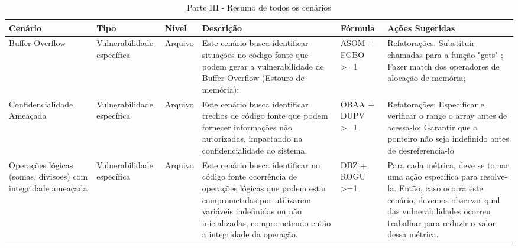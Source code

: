 \begin{landscape}
	\begin{table}[H]
		\begin{center}
	    \begin{tabular}{ |p{}| p{3cm} | p{2cm} | p{5cm} | p{3.5cm}  | p{6.5cm}  |}
	    \hline
Cenário                                                      & Tipo                       & Nível   & Descrição                                                                                                                                                                                                                                                                          & Fórmula                    & Ações Sugeridas                                                                                                                                                                                         \\ \hline
Buffer Overflow                                              & Vulnerabilidade específica & Arquivo & Este cenário busca identificar situações no código fonte que podem gerar a vulnerabilidade de Buffer Overflow (Estouro de memória);                                                                                                                                                & ASOM + FGBO \textgreater=1 & Refatorações: Substituir chamadas para a função "gets" ; Fazer match dos operadores de alocação de memória;                                                                                             \\ \hline
Confidencialidade Ameaçada                                   & Vulnerabilidade específica & Arquivo & Este cenário busca identificar trechos de código fonte que podem fornecer informações não autorizadas, impactando na confidencialidade do sistema.  & OBAA + DUPV \textgreater=1 & Refatorações: Especificar e verificar o range o array antes de acessa-lo; Garantir que o ponteiro não seja indefinido antes de desreferencia-lo                                                         \\ \hline
Operações lógicas (somas, divisoes) com integridade ameaçada & Vulnerabilidade específica & Arquivo & Este cenário busca identificar no código fonte ocorrência de operações lógicas que podem estar comprometidas por utilizarem variáveis indefinidas ou não inicializadas, comprometendo então a integridade da operação.                                                             & DBZ + ROGU \textgreater=1  & Para cada métrica, deve se tomar uma ação específica para resolve-la. Então, caso ocorra este cenário, devemos observar qual das vulnerabilidades ocorreu trabalhar para reduzir o valor dessa métrica. \\ \hline
\end{tabular}
		    \caption{Parte III - Resumo de todos os cenários}
		    \label{tab:resumo3}
		\end{center}
	\end{table}


\end{landscape}

